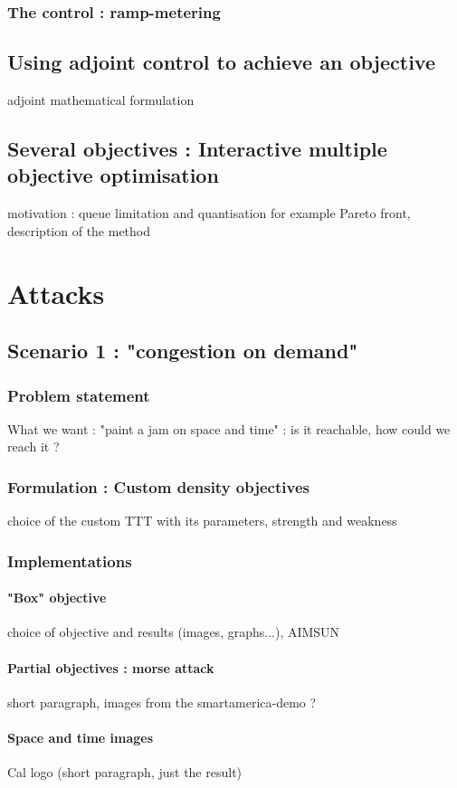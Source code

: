 \documentclass{article}
\begin{document}
		\subsubsection{The control : ramp-metering}	
	\subsection{Using adjoint control to achieve an objective}
		adjoint mathematical formulation
	\subsection{Several objectives : Interactive multiple objective optimisation}
		motivation : queue limitation and quantisation for example
		Pareto front, description of the method 
		
\section{Attacks}
	\subsection{Scenario 1 : "congestion on demand"}
		\subsubsection{Problem statement}
			What we want : "paint a jam on space and time" : is it reachable, how could we reach it ?
		\subsubsection{Formulation : Custom density objectives}
			choice of the custom TTT with its parameters, strength and weakness
		\subsubsection{Implementations}
			\paragraph{"Box" objective}
				choice of objective and results (images, graphs...), AIMSUN
			\paragraph{Partial objectives : morse attack}
				short paragraph, images from the smartamerica-demo ?
			\paragraph{Space and time images}
				Cal logo (short paragraph, just the result)
\end{document}

